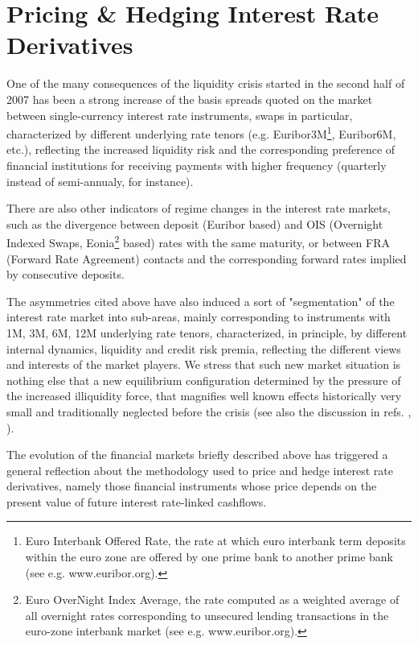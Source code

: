 \documentclass[11pt,reqno]{amsart}
\begin{document}
\section{\label{SecPricing}Pricing \& Hedging Interest Rate Derivatives}
One of the many consequences of the liquidity crisis started in the second half of 2007 has been a strong increase of the basis spreads quoted on the market between single-currency interest rate instruments, swaps in particular, characterized by different underlying rate tenors (e.g. Euribor3M\footnote{Euro Interbank Offered Rate, the rate at which euro interbank term deposits within the euro zone are offered by one prime bank to another prime bank (see e.g. www.euribor.org).}, Euribor6M, etc.), reflecting the increased liquidity risk and the corresponding preference of financial institutions for receiving payments with higher frequency (quarterly instead of semi-annualy, for instance).
\par
There are also other indicators of regime changes in the interest rate markets, such as the divergence between deposit (Euribor based) and OIS (Overnight Indexed Swaps, Eonia\footnote{Euro OverNight Index Average, the rate computed as a weighted average of all overnight rates corresponding to unsecured lending transactions in the euro-zone interbank market (see e.g. www.euribor.org).} based) rates with the same maturity, or between FRA (Forward Rate Agreement) contacts and the corresponding forward rates implied by consecutive deposits. 
\par
The asymmetries cited above have also induced a sort of "segmentation" of the interest rate market into sub-areas, mainly corresponding to instruments with 1M, 3M, 6M, 12M underlying rate tenors, characterized, in principle, by different internal dynamics, liquidity and credit risk premia, reflecting the different views and interests of the market players. We stress that such new market situation is nothing else that a new equilibrium configuration determined by the pressure of the increased illiquidity force, that magnifies well known effects historically very small and traditionally neglected before the crisis (see also the discussion in refs. \cite{Mor08}, \cite{Mer09}).
\par
The evolution of the financial markets briefly described above has triggered a general reflection about the methodology used to price and hedge interest rate derivatives, namely those financial instruments whose price depends on the present value of future interest rate-linked cashflows.
\end{document}
